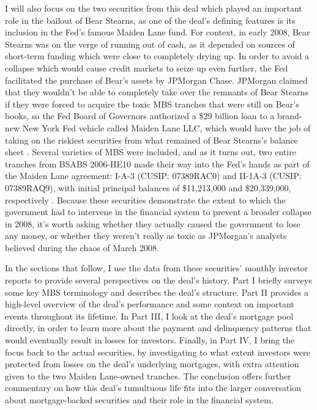 \documentclass[12pt]{article}
\begin{document}
I will also focus on the two securities from this deal which played an important role in the bailout of Bear Stearns, as one of the deal's defining features is its inclusion in the Fed’s famous Maiden Lane fund. For context, in early 2008, Bear Stearns was on the verge of running out of cash, as it depended on sources of short-term funding which were close to completely drying up. In order to avoid a collapse which would cause credit markets to seize up even further, the Fed facilitated the purchase of Bear’s assets by JPMorgan Chase. JPMorgan claimed that they wouldn’t be able to completely take over the remnants of Bear Stearns if they were forced to acquire the toxic MBS tranches that were still on Bear’s books, so the Fed Board of Governors authorized a \$29 billion loan to a brand-new New York Fed vehicle called Maiden Lane LLC, which would have the job of taking on the riskiest securities from what remained of Bear Stearns’s balance sheet \parencite{fcic09}. Several varieties of MBS were included, and as it turns out, two entire tranches from BSABS 2006-HE10 made their way into the Fed’s hands as part of the Maiden Lane agreement: I-A-3 (CUSIP: 07389RAC0) and II-1A-3 (CUSIP: 07389RAQ9), with initial principal balances of \$11,213,000 and \$20,339,000, respectively \parencite{fcic09}. Because these securities demonstrate the extent to which the government had to intervene in the financial system to prevent a broader collapse in 2008, it’s worth asking whether they actually caused the government to lose any money, or whether they weren’t really as toxic as JPMorgan’s analysts believed during the chaos of March 2008.

In the sections that follow, I use the data from these securities' monthly investor reports to provide several perspectives on the deal’s history. Part I briefly surveys some key MBS terminology and describes the deal's structure. Part II provides a high-level overview of the deal’s performance and some context on important events throughout its lifetime. In Part III, I look at the deal’s mortgage pool directly, in order to learn more about the payment and delinquency patterns that would eventually result in losses for investors. Finally, in Part IV, I bring the focus back to the actual securities, by investigating to what extent investors were protected from losses on the deal’s underlying mortgages, with extra attention given to the two Maiden Lane-owned tranches. The conclusion offers further commentary on how this deal’s tumultuous life fits into the larger conversation about mortgage-backed securities and their role in the financial system.
\end{document}
